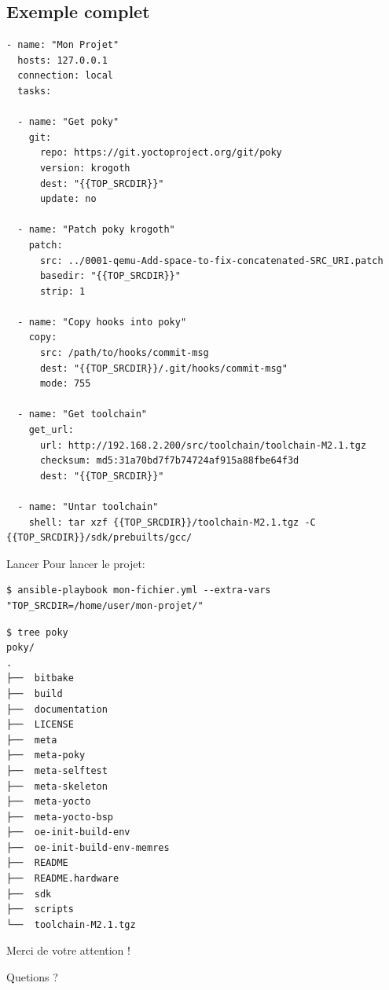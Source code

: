 \documentclass[compress]{smilebeamer}
\begin{document}
\subsection{Exemple complet}
\begin{frame}[fragile]
\begin{lstlisting}[style=bitbake,basicstyle=\tiny\ttfamily\color{white}]
- name: "Mon Projet"
  hosts: 127.0.0.1
  connection: local
  tasks:

  - name: "Get poky"
    git:
      repo: https://git.yoctoproject.org/git/poky
      version: krogoth
      dest: "{{TOP_SRCDIR}}"
      update: no

  - name: "Patch poky krogoth"
    patch:
      src: ../0001-qemu-Add-space-to-fix-concatenated-SRC_URI.patch
      basedir: "{{TOP_SRCDIR}}"
      strip: 1

  - name: "Copy hooks into poky"
    copy:
      src: /path/to/hooks/commit-msg
      dest: "{{TOP_SRCDIR}}/.git/hooks/commit-msg"
      mode: 755

  - name: "Get toolchain"
    get_url:
      url: http://192.168.2.200/src/toolchain/toolchain-M2.1.tgz
      checksum: md5:31a70bd7f7b74724af915a88fbe64f3d
      dest: "{{TOP_SRCDIR}}"

  - name: "Untar toolchain"
    shell: tar xzf {{TOP_SRCDIR}}/toolchain-M2.1.tgz -C {{TOP_SRCDIR}}/sdk/prebuilts/gcc/
\end{lstlisting}
\end{frame}

\begin{frame}[fragile]{Lancer}
Pour lancer le projet:
\begin{lstlisting}[style=shell]
$ ansible-playbook mon-fichier.yml --extra-vars "TOP_SRCDIR=/home/user/mon-projet/"
\end{lstlisting}

\begin{lstlisting}[style=shell,basicstyle=\tiny\ttfamily\color{white}]
$ tree poky
poky/
.
├──  bitbake
├──  build
├──  documentation
├──  LICENSE
├──  meta
├──  meta-poky
├──  meta-selftest
├──  meta-skeleton
├──  meta-yocto
├──  meta-yocto-bsp
├──  oe-init-build-env
├──  oe-init-build-env-memres
├──  README
├──  README.hardware
├──  sdk
├──  scripts
└──  toolchain-M2.1.tgz
\end{lstlisting}
\end{frame}




\begin{frame}
\begin{center}
\huge{Merci de votre attention !}
\end{center}
\begin{center}
Quetions ?
\end{center}
\end{frame}
\end{document}
